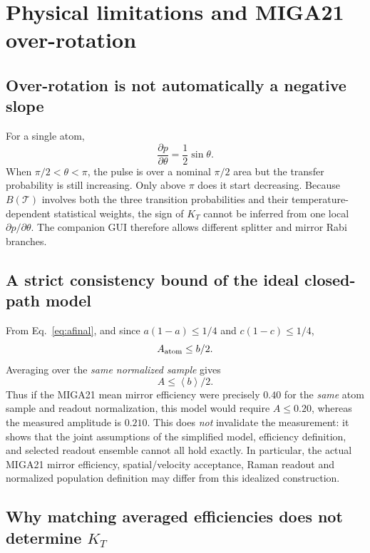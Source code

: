 \documentclass[11pt,a4paper]{article}
\numberwithin{equation}{section}
\newcommand{\Tat}{\mathcal{T}}
\newcommand{\av}[1]{\left\langle #1\right\rangle}
\begin{document}
\section{Physical limitations and MIGA21 over-rotation}

\subsection{Over-rotation is not automatically a negative slope}

For a single atom,
\begin{equation}
\frac{\partial p}{\partial\theta}=\frac12\sin\theta.
\end{equation}
When $\pi/2<\theta<\pi$, the pulse is over a nominal $\pi/2$ area but
the transfer probability is still increasing. Only above $\pi$ does it start
decreasing. Because $B(\Tat)$ involves both the three transition
probabilities and their temperature-dependent statistical weights, the sign of
$K_T$ cannot be inferred from one local $\partial p/\partial\theta$.
The companion GUI therefore allows different splitter and mirror Rabi branches.

\subsection{A strict consistency bound of the ideal closed-path model}

From Eq.~\eqref{eq:afinal}, and since $a(1-a)\leq1/4$ and
$c(1-c)\leq1/4$,
\begin{equation}
 A_{\rm atom}\leq b/2.
\end{equation}
Averaging over the \emph{same normalized sample} gives
\begin{equation}\label{eq:bound}
\boxed{A\leq\av b/2.}
\end{equation}
Thus if the MIGA21 mean mirror efficiency were precisely $0.40$ for the
\emph{same} atom sample and readout normalization, this model would require
$A\leq0.20$, whereas the measured amplitude is $0.210$.
This does \emph{not} invalidate the measurement: it shows that the joint
assumptions of the simplified model, efficiency definition, and selected
readout ensemble cannot all hold exactly. In particular, the actual MIGA21
mirror efficiency, spatial/velocity acceptance, Raman readout and normalized
population definition may differ from this idealized construction.

\subsection{Why matching averaged efficiencies does not determine $K_T$}
\end{document}
